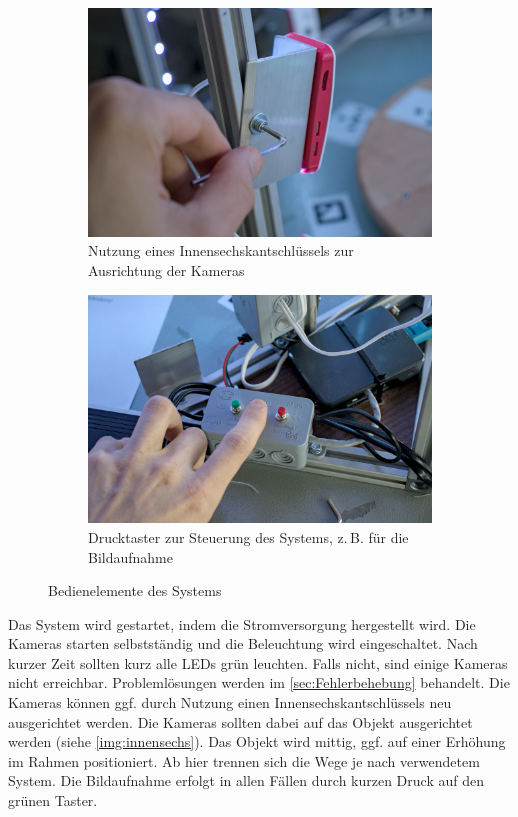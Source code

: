 \documentclass[./00PhotoBox.tex]{subfiles}
\begin{document}
\begin{figure}
    \centering
    \begin{subfigure}{0.48\textwidth}
        \includegraphics[width=1\textwidth]{img/9_anleitung/innensechs.jpg}
        \caption{Nutzung eines Innensechskantschlüssels zur Ausrichtung der Kameras}
        \label{img:innensechs}
    \end{subfigure}
    \begin{subfigure}{0.48\textwidth}
        \includegraphics[width=1\textwidth]{img/9_anleitung/taster.jpg}
        \caption{Drucktaster zur Steuerung des Systems, z.\,B. für die Bildaufnahme}
        \label{img:taster}
    \end{subfigure}
    \caption{Bedienelemente des Systems}
\end{figure}

Das System wird gestartet, indem die Stromversorgung hergestellt wird. Die Kameras starten selbstständig und die Beleuchtung wird eingeschaltet. Nach kurzer Zeit sollten kurz alle LEDs grün leuchten. Falls nicht, sind einige Kameras nicht erreichbar. Problemlösungen werden im \autoref{sec:Fehlerbehebung} behandelt. Die Kameras können ggf. durch Nutzung einen Innensechskantschlüssels neu ausgerichtet werden. Die Kameras sollten dabei auf das Objekt ausgerichtet werden (siehe \autoref{img:innensechs}).
Das Objekt wird mittig, ggf. auf einer Erhöhung im Rahmen positioniert.
Ab hier trennen sich die Wege je nach verwendetem System. Die Bildaufnahme erfolgt in allen Fällen durch kurzen Druck auf den grünen Taster.
\end{document}
